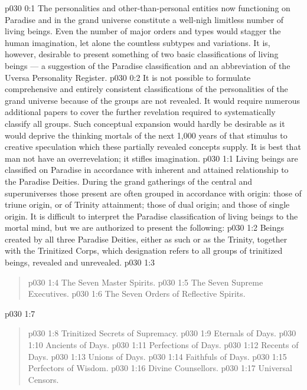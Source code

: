 \author{Mighty Messenger}
\vs p030 0:1 The personalities and other\hyp{}than\hyp{}personal entities now functioning on Paradise and in the grand universe constitute a well\hyp{}nigh limitless number of living beings. Even the number of major orders and types would stagger the human imagination, let alone the countless subtypes and variations. It is, however, desirable to present something of two basic classifications of living beings --- a suggestion of the Paradise classification and an abbreviation of the Uversa Personality Register.
\vs p030 0:2 It is not possible to formulate comprehensive and entirely consistent classifications of the personalities of the grand universe because  of the groups are not revealed. It would require numerous additional papers to cover the further revelation required to systematically classify all groups. Such conceptual expansion would hardly be desirable as it would deprive the thinking mortals of the next 1,000 years of that stimulus to creative speculation which these partially revealed concepts supply. It is best that man not have an overrevelation; it stifles imagination.
\vs p030 1:1 Living beings are classified on Paradise in accordance with inherent and attained relationship to the Paradise Deities. During the grand gatherings of the central and superuniverses those present are often grouped in accordance with origin: those of triune origin, or of Trinity attainment; those of dual origin; and those of single origin. It is difficult to interpret the Paradise classification of living beings to the mortal mind, but we are authorized to present the following:
\vsetspace
\vs p030 1:2 \bibnobreakspace {} Beings created by all three Paradise Deities, either as such or as the Trinity, together with the Trinitized Corps, which designation refers to all groups of trinitized beings, revealed and unrevealed.
\vsetspace
\vs p030 1:3 \bibnobreakspace {}
\begin{quote}
\vs p030 1:4 \bibnobreakspace The Seven Master Spirits.
\vs p030 1:5 \bibnobreakspace The Seven Supreme Executives.
\vs p030 1:6 \bibnobreakspace The Seven Orders of Reflective Spirits.
\end{quote}
\vsetspace
\vs p030 1:7 \bibnobreakspace {}
\begin{quote}
\vs p030 1:8 \bibnobreakspace Trinitized Secrets of Supremacy.
\vs p030 1:9 \bibnobreakspace Eternals of Days.
\vs p030 1:10 \bibnobreakspace Ancients of Days.
\vs p030 1:11 \bibnobreakspace Perfections of Days.
\vs p030 1:12 \bibnobreakspace Recents of Days.
\vs p030 1:13 \bibnobreakspace Unions of Days.
\vs p030 1:14 \bibnobreakspace Faithfuls of Days.
\vs p030 1:15 \bibnobreakspace Perfectors of Wisdom.
\vs p030 1:16 \bibnobreakspace Divine Counsellors.
\vs p030 1:17 \bibnobreakspace Universal Censors.
\end{quote}

